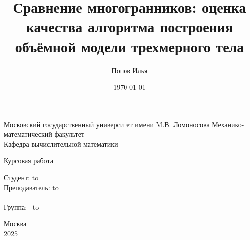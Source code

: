 \documentclass[a4paper,14pt]{extarticle}
\author{Попов Илья}
\theoremstyle{remark} %
\begin{document}
\begin{titlepage}
    \newpage
    \begin{center}
        Московский государственный университет имени M.В. Ломоносова
        Механико-математический факультет\\
        Кафедра вычислительной математики \\
    \end{center}

    \vspace{8em}

    \begin{center}
        \Large Курсовая работа \\
    \end{center}

    \vspace{2em}

    \begin{center}
        \textsc{\textbf{}}
    \end{center}

    \vspace{20em}

    \newbox{\lbox}
    \newlength{\maxl}
    \setlength{\maxl}{\wd\lbox}
    \hfill\parbox{13cm}{
        \hspace*{5cm}\hspace*{-5cm}Студент: \qquad\qquad\hbox to \\
        \hspace*{5cm}\hspace*{-5cm}Преподаватель: \hbox to \\
        \\
        \hspace*{5cm}\hspace*{-5cm}Группа:\qquad\qquad $\;\:$ \hbox to\\
    }

    \vspace{\fill}

    \begin{center}
        Москва \\2025
    \end{center}

\end{titlepage}
\newpage


\title{Сравнение многогранников: оценка качества алгоритма построения объёмной модели трехмерного тела}
\date{\today}
\end{document}
